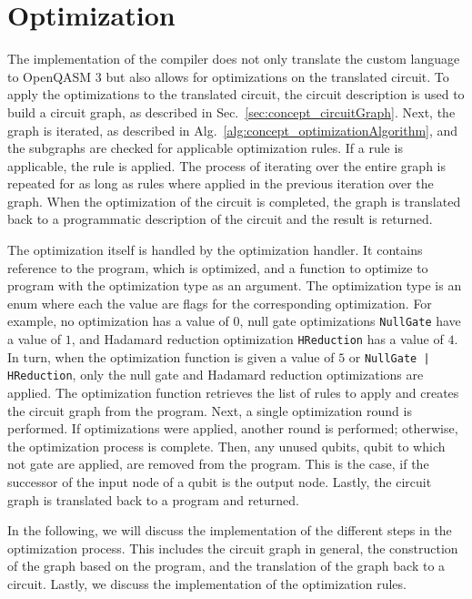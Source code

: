 \section{Optimization}
The implementation of the compiler does not only translate the custom language to OpenQASM 3 but
also allows for optimizations on the translated circuit. 
To apply the optimizations to the translated circuit, the circuit description is used to build a circuit graph, as described in Sec.~\ref{sec:concept_circuitGraph}. Next, the graph is iterated, as described in Alg.~\ref{alg:concept_optimizationAlgorithm}, and the subgraphs are checked for applicable optimization rules. If a rule is applicable, the rule is applied. The process of iterating over the entire graph is repeated for as long as rules where applied in the previous iteration over the graph. When the optimization of the circuit is completed, the graph is translated back to a programmatic description of the circuit and the result is returned.

The optimization itself is handled by the optimization handler. It contains reference to the program, which is optimized, and a function to optimize to program with the optimization type as an argument. The optimization type is an enum where each the value are flags for the corresponding optimization. For example, no optimization has a value of $0$, null gate optimizations \texttt{NullGate} have a value of $1$, and Hadamard reduction optimization \texttt{HReduction} has a value of $4$. In turn, when the optimization function is given a value of $5$ or \texttt{NullGate | HReduction}, only the null gate and Hadamard reduction optimizations are applied. The optimization function retrieves the list of rules to apply and creates the circuit graph from the program. Next, a single optimization round is performed. If optimizations were applied, another round is performed; otherwise, the optimization process is complete. Then, any unused qubits, \ie qubit to which not gate are applied, are removed from the program. This is the case, if the successor of the input node of a qubit is the output node. Lastly, the circuit graph is translated back to a program and returned.

In the following, we will discuss the implementation of the different steps in the optimization process. This includes the circuit graph in general, the construction of the graph based on the program, and the translation of the graph back to a circuit. Lastly, we discuss the implementation of the optimization rules.


